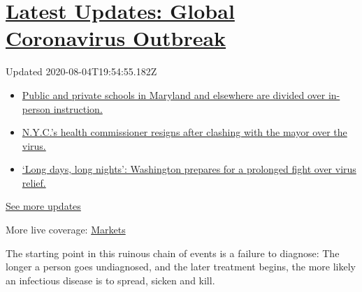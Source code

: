 \hypertarget{latest-updates-global-coronavirus-outbreak}{%
\section{\texorpdfstring{\href{https://www.nytimes3xbfgragh.onion/2020/08/04/world/coronavirus-cases.html?action=click\&pgtype=Article\&state=default\&region=MAIN_CONTENT_1\&context=storylines_live_updates}{Latest
Updates: Global Coronavirus
Outbreak}}{Latest Updates: Global Coronavirus Outbreak}}\label{latest-updates-global-coronavirus-outbreak}}

Updated 2020-08-04T19:54:55.182Z

\begin{itemize}
\tightlist
\item
  \href{https://www.nytimes3xbfgragh.onion/2020/08/04/world/coronavirus-cases.html?action=click\&pgtype=Article\&state=default\&region=MAIN_CONTENT_1\&context=storylines_live_updates\#link-4825b93}{Public
  and private schools in Maryland and elsewhere are divided over
  in-person instruction.}
\item
  \href{https://www.nytimes3xbfgragh.onion/2020/08/04/world/coronavirus-cases.html?action=click\&pgtype=Article\&state=default\&region=MAIN_CONTENT_1\&context=storylines_live_updates\#link-4d1eafa8}{N.Y.C.'s
  health commissioner resigns after clashing with the mayor over the
  virus.}
\item
  \href{https://www.nytimes3xbfgragh.onion/2020/08/04/world/coronavirus-cases.html?action=click\&pgtype=Article\&state=default\&region=MAIN_CONTENT_1\&context=storylines_live_updates\#link-6b644638}{`Long
  days, long nights': Washington prepares for a prolonged fight over
  virus relief.}
\end{itemize}

\href{https://www.nytimes3xbfgragh.onion/2020/08/04/world/coronavirus-cases.html?action=click\&pgtype=Article\&state=default\&region=MAIN_CONTENT_1\&context=storylines_live_updates}{See
more updates}

More live coverage:
\href{https://www.nytimes3xbfgragh.onion/live/2020/08/04/business/stock-market-today-coronavirus?action=click\&pgtype=Article\&state=default\&region=MAIN_CONTENT_1\&context=storylines_live_updates}{Markets}

The starting point in this ruinous chain of events is a failure to
diagnose: The longer a person goes undiagnosed, and the later treatment
begins, the more likely an infectious disease is to spread, sicken and
kill.

